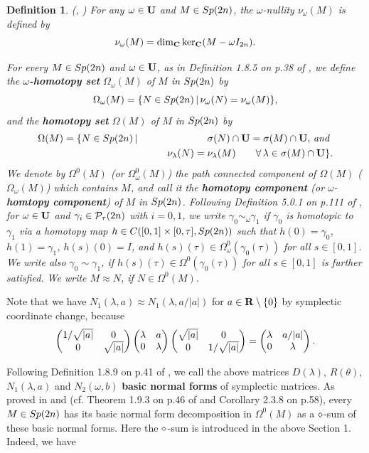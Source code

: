 \documentclass[11pt]{article}
\newtheorem{definition}[lemma]{Definition}
\def\be{\begin{equation}}
\def\ee{\end{equation}}
\def\bea{\begin{eqnarray}}
\def\eea{\end{eqnarray}}
\def\nn{\nonumber}
\def\lb{\label}
\def\bs{\setminus}
\def\R{{\bf R}}
\def\C{{\bf C}}
\def\U{{\bf U}}
\def\ga{{\gamma}}
\def\th{{\theta}}
\def\om{{\omega}}
\def\Om{{\Omega}}
\def\lm{{\lambda}}
\def\sg{{\sigma}}
\def\P{{\cal P}}
\def\Sp{{\rm Sp}}
\def\dm{{\rm \diamond}}
\begin{document}
\begin{definition}\lb{D2.1} (\cite{Lon2}, \cite{Lon4})
For any $\om\in\U$ and $M\in \Sp(2n)$, the $\om$-nullity $\nu_{\om}(M)$ is defined by
\be \nu_{\om}(M)=\dim_{\C}\ker_{\C}(M - \om I_{2n}).  \lb{A2.2}\ee

For every $M\in \Sp(2n)$ and $\om\in\U$, as in Definition 1.8.5 on p.38 of \cite{Lon4}, we define the
{\bf $\om$-homotopy set} $\Om_{\om}(M)$ of $M$ in $\Sp(2n)$ by
$$  \Om_{\om}(M)=\{N\in\Sp(2n)\,|\, \nu_{\om}(N)=\nu_{\om}(M)\},  $$
and the {\bf homotopy set} $\Om(M)$ of $M$ in $\Sp(2n)$ by
\bea  \Om(M)=\{N\in\Sp(2n)\,&|&\,\sg(N)\cap\U=\sg(M)\cap\U,\,{\it and}\; \nn\\
         &&\qquad \nu_{\lm}(N)=\nu_{\lm}(M)\qquad\forall\,\lm\in\sg(M)\cap\U\}.  \nn\eea
We denote by $\Om^0(M)$ (or $\Om^0_{\om}(M)$) the path connected component of $\Om(M)$ ($\Om_{\om}(M)$)
which contains $M$, and call it the {\bf homotopy component} (or $\om$-{\bf homtopy component}) of $M$ in
$\Sp(2n)$. Following Definition 5.0.1 on p.111 of \cite{Lon4}, for $\om\in \U$ and $\ga_i\in \P_{\tau}(2n)$
with $i=0, 1$, we write $\ga_0\sim_{\om}\ga_1$ if $\ga_0$ is homotopic to $\ga_1$ via
a homotopy map $h\in C([0,1]\times [0,\tau], \Sp(2n))$ such that $h(0)=\ga_0$, $h(1)=\ga_1$, $h(s)(0)=I$,
and $h(s)(\tau)\in \Om_{\om}^0(\ga_0(\tau))$ for all $s\in [0,1]$. We write also $\ga_0\sim \ga_1$, if
$h(s)(\tau)\in \Om^0(\ga_0(\tau))$ for all $s\in [0,1]$ is further satisfied. We write $M\approx N$, if
$N\in \Om^0(M)$.
\end{definition}

Note that we have $N_1(\lm,a)\approx N_1(\lm, a/|a|)$ for $a\in\R\bs\{0\}$ by symplectic coordinate
change, because
$$ \left(\begin{matrix}1/\sqrt{|a|} & 0\cr
                           0  & \sqrt{|a|}\cr\end{matrix}\right)
   \left(\begin{matrix}\lm & a\cr
                  0  & \lm\cr\end{matrix}\right)
   \left(\begin{matrix}\sqrt{|a|} & 0\cr
                           0  & 1/\sqrt{|a|}\cr\end{matrix}\right) = \left(\begin{matrix}\lm & a/|a|\cr
                                                                         0  & \lm\cr\end{matrix}\right). $$

Following Definition 1.8.9 on p.41 of \cite{Lon4}, we call the above matrices $D(\lm)$, $R(\th)$, $N_1(\lm,a)$
and $N_2(\om,b)$ {\bf basic normal forms} of symplectic matrices. As proved in \cite{Lon2} and \cite{Lon3} (cf.
Theorem 1.9.3 on p.46 of \cite{Lon4} and Corollary 2.3.8 on p.58), every $M\in\Sp(2n)$ has its basic normal
form decomposition in $\Om^0(M)$ as a $\dm$-sum of these basic normal forms. Here the $\dm$-sum is introduced
in the above Section 1. Indeed, we have
\end{document}
